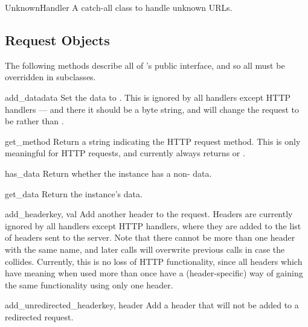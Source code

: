 \begin{classdesc}{UnknownHandler}{}
A catch-all class to handle unknown URLs.
\end{classdesc}


\subsection{Request Objects \label{request-objects}}

The following methods describe all of 's public interface,
and so all must be overridden in subclasses.

\begin{methoddesc}[Request]{add_data}{data}
Set the  data to .  This is ignored by all
handlers except HTTP handlers --- and there it should be a byte
string, and will change the request to be  rather than
.
\end{methoddesc}

\begin{methoddesc}[Request]{get_method}{}
Return a string indicating the HTTP request method.  This is only
meaningful for HTTP requests, and currently always returns
 or .
\end{methoddesc}

\begin{methoddesc}[Request]{has_data}{}
Return whether the instance has a non- data.
\end{methoddesc}

\begin{methoddesc}[Request]{get_data}{}
Return the instance's data.
\end{methoddesc}

\begin{methoddesc}[Request]{add_header}{key, val}
Add another header to the request.  Headers are currently ignored by
all handlers except HTTP handlers, where they are added to the list
of headers sent to the server.  Note that there cannot be more than
one header with the same name, and later calls will overwrite
previous calls in case the  collides.  Currently, this is
no loss of HTTP functionality, since all headers which have meaning
when used more than once have a (header-specific) way of gaining the
same functionality using only one header.
\end{methoddesc}

\begin{methoddesc}[Request]{add_unredirected_header}{key, header}
Add a header that will not be added to a redirected request.
\end{methoddesc}

